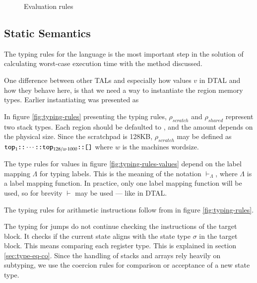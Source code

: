\begin{figure}
    
    \caption{Evaluation rules}
    \label{fig:eval-rules}
\end{figure}

\subsection{Static Semantics}
The typing rules for the language is the most important step in the solution of
calculating worst-case execution time with the method discussed.

One difference between other TALs and especially how values $v$ in DTAL and how
they behave here, is that we need a way to instantiate the region memory types.
Earlier instantiating was presented as 

In figure \ref{fig:typing-rules} presenting the typing rules, $\rho_{scratch}$
and $\rho_{shared}$ represent two stack types.
Each region should be defaulted to \ttop, and the amount depends on the
physical size. Since the scratchpad is 128KB\cite{sigma}, $\rho_{scratch}$ may
be defined as $\texttt{top}_1 \texttt{::} \cdots \texttt{::} \texttt{top}_{128 / w \cdot 1000} \texttt{::}
\texttt{[]}$ where $w$ is the machines wordsize.

The type rules for values in figure \ref{fig:typing-rules-values} depend on the
label mapping $\Lambda$ for typing labels. This is the meaning of the notation
$\vdash_\Lambda$, where $\Lambda$ is a label mapping function.
In practice, only one label mapping function will be used, so for brevity
$\vdash$ may be used --- like in DTAL.

The typing rules for arithmetic instructions follow from \add in figure
\ref{fig:typing-rules}.

The typing for jumps \jump do not continue checking the instructions of the
target block.
It checks if the current state aligns with the state type $\sigma$ in the
target block.
This means comparing each register type. This is explained in section
\ref{sec:type-eq-co}.
Since the handling of stacks and arrays rely heavily on subtyping, we use the
coercion rules for comparison or acceptance of a new state type.


